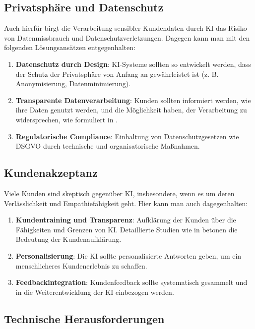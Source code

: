 \documentclass[12pt]{article}
\begin{document}
\subsection{Privatsphäre und Datenschutz}

Auch hierfür birgt die Verarbeitung sensibler Kundendaten durch KI das Risiko von Datenmissbrauch und Datenschutzverletzungen. Dagegen kann man mit den folgenden Lösungsansätzen entgegenhalten:

\begin{enumerate}
    \item \textbf{Datenschutz durch Design}: KI-Systeme sollten so entwickelt werden, dass der Schutz der Privatsphäre von Anfang an gewährleistet ist (z. B. Anonymisierung, Datenminimierung).
    \item \textbf{Transparente Datenverarbeitung}: Kunden sollten informiert werden, wie ihre Daten genutzt werden, und die Möglichkeit haben, der Verarbeitung zu widersprechen, wie formuliert in \cite{Humm2022}.
    \item \textbf{Regulatorische Compliance}: Einhaltung von Datenschutzgesetzen wie DSGVO durch technische und organisatorische Maßnahmen.
\end{enumerate}

\subsection{Kundenakzeptanz}

Viele Kunden sind skeptisch gegenüber KI, insbesondere, wenn es um deren Verlässlichkeit und Empathiefähigkeit geht. Hier kann man auch dagegenhalten:

\begin{enumerate}
    \item \textbf{Kundentraining und Transparenz}: Aufklärung der Kunden über die Fähigkeiten und Grenzen von KI. Detaillierte Studien wie in \cite{pi2024contactcomplexitycustomerservice} betonen die Bedeutung der Kundenaufklärung.
    \item \textbf{Personalisierung}: Die KI sollte personalisierte Antworten geben, um ein menschlicheres Kundenerlebnis zu schaffen.
    \item \textbf{Feedbackintegration}: Kundenfeedback sollte systematisch gesammelt und in die Weiterentwicklung der KI einbezogen werden.
\end{enumerate}

\subsection{Technische Herausforderungen}
\end{document}
